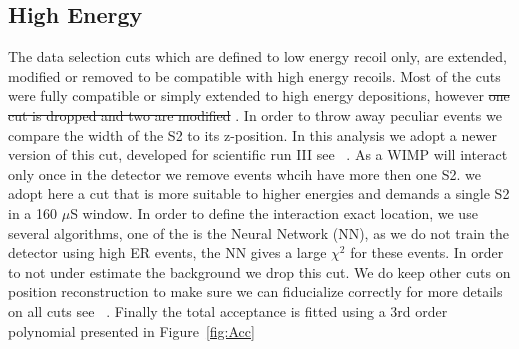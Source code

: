 \subsection{High Energy}
\label{subsubsec:HighE}


The data selection cuts which are defined to low energy recoil only, are extended, modified or removed to be compatible with high energy recoils. Most of the cuts were fully compatible or simply extended to high energy depositions, however \sout{one cut is dropped and two are modified} . In order to throw away peculiar events we compare the width of the S2 to its z-position. In this analysis we adopt a newer version of this cut, developed for scientific run III see ~\cite{xe100_run_combination}. As a WIMP will interact only once in the detector we remove events whcih have more then one S2. we adopt here a cut that is more suitable to higher energies and demands a single S2 in a 160 $\mu$S window. In order to define the interaction exact location, we use several algorithms, one of the is the Neural Network (NN), as we do not train the detector using high ER events, the NN gives a large $\chi^2$ for these events. In order to not under estimate the background we drop this cut. We do keep other cuts on position reconstruction to make sure we can fiducialize correctly for more details on all cuts see ~\cite{xe100_ana2012}. Finally the total acceptance is fitted using a 3rd order polynomial presented in Figure~\ref{fig:Acc}

